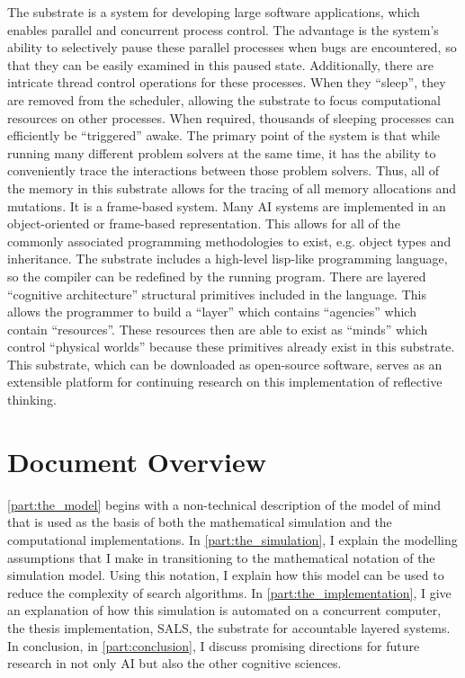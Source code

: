 The substrate is a system for developing large software applications,
which enables parallel and concurrent process control.  The advantage
is the system's ability to selectively pause these parallel processes
when bugs are encountered, so that they can be easily examined in this
paused state.  Additionally, there are intricate thread control
operations for these processes.  When they ``sleep'', they are removed
from the scheduler, allowing the substrate to focus computational
resources on other processes.  When required, thousands of sleeping
processes can efficiently be ``triggered'' awake.  The primary point
of the system is that while running many different problem solvers at
the same time, it has the ability to conveniently trace the
interactions between those problem solvers.  Thus, all of the memory
in this substrate allows for the tracing of all memory allocations and
mutations.  It is a frame-based system.  Many AI systems are
implemented in an object-oriented or frame-based representation.  This
allows for all of the commonly associated programming methodologies to
exist, e.g.  object types and inheritance.  The substrate includes a
high-level lisp-like programming language, so the compiler can be
redefined by the running program.  There are layered ``cognitive
architecture'' structural primitives included in the language.  This
allows the programmer to build a ``layer'' which contains ``agencies''
which contain ``resources''.  These resources then are able to exist
as ``minds'' which control ``physical worlds'' because these
primitives already exist in this substrate.  This substrate, which can
be downloaded as open-source software, serves as an extensible
platform for continuing research on this implementation of reflective
thinking.

\section{Document Overview}

{\mbox{\autoref{part:the_model}}} begins with a non-technical
description of the model of mind that is used as the basis of both the
mathematical simulation and the computational implementations.  In
{\mbox{\autoref{part:the_simulation}}}, I explain the modelling
assumptions that I make in transitioning to the mathematical notation
of the simulation model.  Using this notation, I explain how this
model can be used to reduce the complexity of search algorithms.  In
{\mbox{\autoref{part:the_implementation}}}, I give an explanation of
how this simulation is automated on a concurrent computer, the thesis
implementation, SALS, the substrate for accountable layered systems.
In conclusion, in {\mbox{\autoref{part:conclusion}}}, I discuss
promising directions for future research in not only AI but also the
other cognitive sciences.

